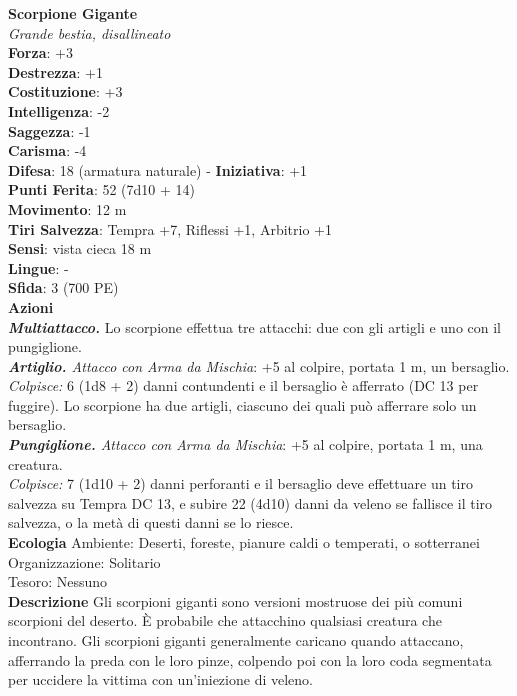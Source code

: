 \begin{multicols}{2}
\medskip\textbf{Scorpione Gigante}\\
\emph{Grande bestia, disallineato}\\
\textbf{Forza}: +3\\
\textbf{Destrezza}: +1\\
\textbf{Costituzione}: +3\\
\textbf{Intelligenza}: -2\\
\textbf{Saggezza}: -1\\
\textbf{Carisma}: -4\\
\textbf{Difesa}: 18 (armatura naturale) - \textbf{Iniziativa}: +1\\
\textbf{Punti Ferita}: 52 (7d10 + 14)\\
\textbf{Movimento}: 12 m\\
\textbf{Tiri Salvezza}: Tempra +7, Riflessi +1, Arbitrio +1\\
\textbf{Sensi}: vista cieca 18 m\\
\textbf{Lingue}: -\\
\textbf{Sfida}: 3 (700 PE)\smallskip\\
\smallskip\textbf{Azioni}\\
\emph{\textbf{Multiattacco.}} Lo scorpione effettua tre attacchi: due con gli artigli e uno con il pungiglione.\\
\emph{\textbf{Artiglio.} Attacco con Arma da Mischia}: +5 al colpire, portata 1 m, un bersaglio.\\
\emph{Colpisce:} 6 (1d8 + 2) danni contundenti e il bersaglio è afferrato (DC  13 per fuggire). Lo scorpione ha due artigli, ciascuno dei quali può afferrare solo un bersaglio.\\
\emph{\textbf{Pungiglione.} Attacco con Arma da Mischia}: +5 al colpire, portata 1 m, una creatura.\\
\emph{Colpisce:} 7 (1d10 + 2) danni perforanti e il bersaglio deve effettuare un tiro salvezza su Tempra DC  13, e subire 22 (4d10) danni da veleno se fallisce il tiro salvezza, o la metà di questi danni se lo riesce.\\
\textbf{Ecologia}
Ambiente: Deserti, foreste, pianure caldi o temperati, o sotterranei\\
Organizzazione: Solitario\\
Tesoro: Nessuno\\
\textbf{Descrizione}
Gli scorpioni giganti sono versioni mostruose dei più comuni scorpioni del deserto. È probabile che attacchino qualsiasi creatura che incontrano. Gli scorpioni giganti generalmente caricano quando attaccano, afferrando la preda con le loro pinze, colpendo poi con la loro coda segmentata per uccidere la vittima con un’iniezione di veleno.\\


\end{multicols}
